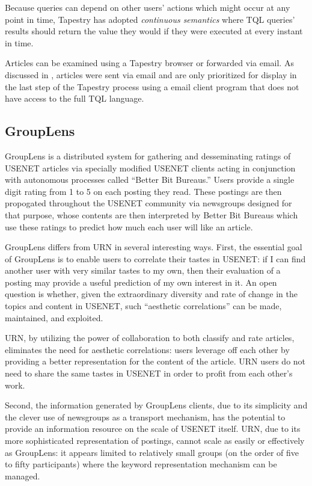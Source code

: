 Because queries can depend on other users' actions which might occur at any
point in time, Tapestry has adopted {\em continuous semantics} where TQL
queries' results should return the value they would if they were executed at
every instant in time.

Articles can be examined using a Tapestry browser or forwarded via email. As
discussed in \cite{cacm-tapestry-92}, articles were sent via email and are only
prioritized for display in the last step of the Tapestry process using a email
client program that does not have access to the full TQL language.

\subsection{GroupLens}

GroupLens \cite{Resnick94} is a distributed system for gathering and
desseminating ratings of USENET articles via specially modified USENET
clients acting in conjunction with autonomous processes called ``Better Bit
Bureaus.''  Users provide a single digit rating from 1 to 5 on each posting
they read.  These postings are then propogated throughout the USENET
community via newsgroups designed for that purpose, whose contents are then
interpreted by Better Bit Bureaus which use these ratings to predict how
much each user will like an article.  

GroupLens differs from URN in several interesting ways.  First, the
essential goal of GroupLens is to enable users to correlate their tastes in
USENET: if I can find another user with very similar tastes to my own, then
their evaluation of a posting may provide a useful prediction of my own
interest in it. An open question is whether, given the extraordinary
diversity and rate of change in the topics and content in USENET, such 
``aesthetic correlations'' can be made, maintained, and exploited.  

URN, by utilizing the power of collaboration to both classify and rate
articles, eliminates the need for aesthetic correlations: users leverage
off each other by providing a better representation for the content of the
article.  URN users do not need to share the same tastes in USENET in order
to profit from each other's work. 

Second, the information generated by GroupLens clients, due to its
simplicity and the clever use of newsgroups as a transport mechanism, has
the potential to provide an information resource on the scale of USENET
itself.  URN, due to its more sophisticated representation of postings,
cannot scale as easily or effectively as GroupLens: it appears limited to 
relatively small groups (on the order of five to fifty participants) where 
the keyword representation mechanism can be managed.  
